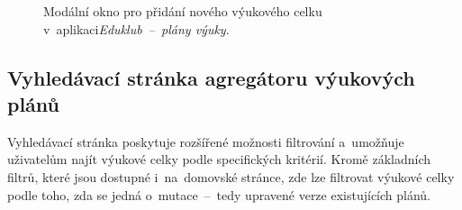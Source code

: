 \documentclass[male,czech,api_bc]{kitheses}
\begin{document}
\begin{figure}[H]
	\centering
	\caption{Modální okno pro přidání nového výukového celku v~aplikaci\break\textit{Eduklub~--~plány výuky}.}
	\label{fig:eduklub-2}
\end{figure}

\newpage

\subsection{Vyhledávací stránka agregátoru výukových plánů}

Vyhledávací stránka poskytuje rozšířené možnosti filtrování a~umožňuje uživatelům najít výukové celky podle specifických kritérií. Kromě základních filtrů, které jsou dostupné i~na~domovské stránce, zde lze filtrovat výukové celky podle toho, zda se jedná o~mutace~--~tedy upravené verze existujících plánů.
\end{document}
